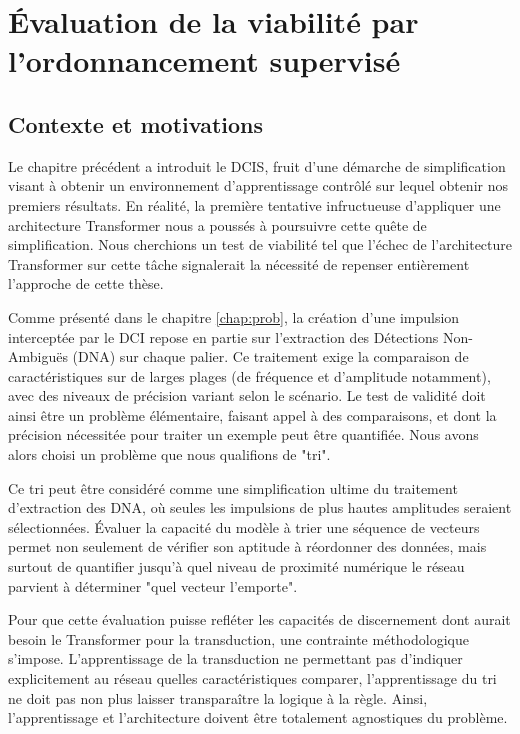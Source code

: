 \chapter{Évaluation de la viabilité par l'ordonnancement supervisé}
\label{chap:eusipco}
\section{Contexte et motivations}
Le chapitre précédent a introduit le DCIS, fruit d'une démarche de simplification visant à obtenir un environnement d'apprentissage contrôlé sur lequel obtenir nos premiers résultats. En réalité, la première tentative infructueuse d'appliquer une architecture Transformer nous a poussés à poursuivre cette quête de simplification. Nous cherchions un test de viabilité tel que l'échec de l'architecture Transformer sur cette tâche signalerait la nécessité de repenser entièrement l'approche de cette thèse.

Comme présenté dans le chapitre \ref{chap:prob}, la création d'une impulsion interceptée par le DCI repose en partie sur l'extraction des Détections Non-Ambiguës (DNA) sur chaque palier. Ce traitement exige la comparaison de caractéristiques sur de larges plages (de fréquence et d'amplitude notamment), avec des niveaux de précision variant selon le scénario. Le test de validité doit ainsi être un problème élémentaire, faisant appel à des comparaisons, et dont la précision nécessitée pour traiter un exemple peut être quantifiée. Nous avons alors choisi un problème que nous qualifions de "tri".

Ce tri peut être considéré comme une simplification ultime du traitement d'extraction des DNA, où seules les impulsions de plus hautes amplitudes seraient sélectionnées. Évaluer la capacité du modèle à trier une séquence de vecteurs permet non seulement de vérifier son aptitude à réordonner des données, mais surtout de quantifier jusqu'à quel niveau de proximité numérique le réseau parvient à déterminer "quel vecteur l'emporte".

Pour que cette évaluation puisse refléter les capacités de discernement dont aurait besoin le Transformer pour la transduction, une contrainte méthodologique s'impose. L'apprentissage de la transduction ne permettant pas d'indiquer explicitement au réseau quelles caractéristiques comparer, l'apprentissage du tri ne doit pas non plus laisser transparaître la logique à la règle. Ainsi, l'apprentissage et l'architecture doivent être totalement agnostiques du problème.

